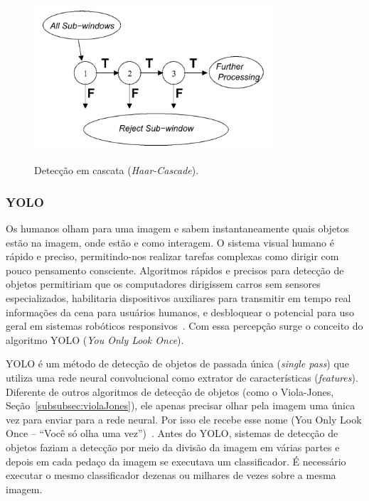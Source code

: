 \begin{figure}[!hbtp]
  \centering
   \caption{Detecção em cascata (\textit{Haar-Cascade}).}
    \includegraphics[width = 0.8\textwidth]{Caps/Figs/ref-teorico/detecCascade.png}
   \label{fig:deteccaoCascade}
\end{figure}

\subsubsection{YOLO}
\label{subsubsec:yolo}

Os humanos olham para uma imagem e sabem instantaneamente quais objetos estão na imagem, onde estão e como interagem. O sistema visual humano é rápido e preciso, permitindo-nos realizar tarefas complexas como dirigir com pouco pensamento consciente. Algoritmos rápidos e precisos para detecção de objetos permitiriam que os computadores dirigissem carros sem sensores especializados, habilitaria dispositivos auxiliares para transmitir em tempo real informações da cena para usuários humanos, e desbloquear o potencial para uso geral em sistemas robóticos responsivos~\cite{Redmon_2016_CVPR}. Com essa percepção surge o conceito do algoritmo YOLO (\textit{You Only Look Once}).

YOLO é um método de detecção de objetos de passada única (\textit{single pass}) que utiliza uma rede neural convolucional como extrator de características (\textit{features}). Diferente de outros algoritmos de detecção de objetos (como o Viola-Jones, Seção~\ref{subsubsec:violaJones}), ele apenas precisar olhar pela imagem uma única vez para enviar para a rede neural. Por isso ele recebe esse nome (You Only Look Once – “Você só olha uma vez”)~\cite{alvesGabriel2020}. Antes do YOLO, sistemas de detecção de objetos faziam a detecção por meio da divisão da imagem em várias partes e depois em cada pedaço da imagem se executava um classificador. É necessário executar o mesmo classificador dezenas ou milhares de vezes sobre a mesma imagem.


